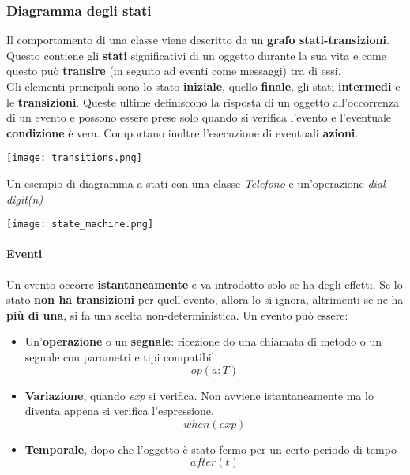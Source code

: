 \subsubsection{Diagramma degli stati}
Il comportamento di una classe viene descritto da un \textbf{grafo stati-transizioni}. Questo contiene gli \textbf{stati} significativi di un oggetto durante la sua vita e come questo può \textbf{transire} (in seguito ad eventi come messaggi) tra di essi.\\
Gli elementi principali sono lo stato \textbf{iniziale}, quello \textbf{finale}, gli stati \textbf{intermedi} e le \textbf{transizioni}. Queste ultime definiscono la risposta di un oggetto all'occorrenza di un evento e possono essere prese solo quando si verifica l'evento e l'eventuale \textbf{condizione} è vera. Comportano inoltre l'esecuzione di eventuali \textbf{azioni}.
\begin{center}
	\texttt{[image: transitions.png]}
\end{center}

\begin{example}
	Un esempio di diagramma a stati con una classe \textit{Telefono} e un'operazione \textit{dial digit(n)}
	\begin{center}
		\texttt{[image: state\_machine.png]}
	\end{center}
\end{example}

\paragraph{Eventi}
Un evento occorre \textbf{istantaneamente} e va introdotto solo se ha degli effetti. Se lo stato \textbf{non ha transizioni} per quell'evento, allora lo si ignora, altrimenti se ne ha \textbf{più di una}, si fa una scelta non-deterministica. Un evento può essere:
\begin{itemize}
	\item Un'\textbf{operazione} o un \textbf{segnale}: ricezione do una chiamata di metodo o un segnale con parametri e tipi compatibili
	\begin{equation*}
		op(a:T)
	\end{equation*}
	\item \textbf{Variazione}, quando \textit{exp} si verifica. Non avviene istantaneamente ma lo diventa appena si verifica l'espressione.
	\begin{equation*}
		when(exp)
	\end{equation*}
	\item \textbf{Temporale}, dopo che l'oggetto è stato fermo per un certo periodo di tempo
	\begin{equation*}
		after(t)
	\end{equation*}
\end{itemize}

